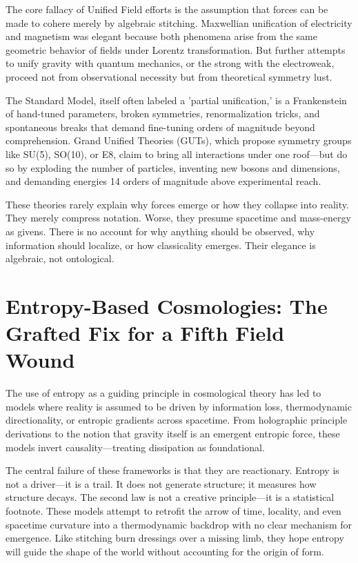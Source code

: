 The core fallacy of Unified Field efforts is the assumption that forces can be made to cohere merely by algebraic stitching. Maxwellian unification of electricity and magnetism was elegant because both phenomena arise from the same geometric behavior of fields under Lorentz transformation. But further attempts to unify gravity with quantum mechanics, or the strong with the electroweak, proceed not from observational necessity but from theoretical symmetry lust.

The Standard Model, itself often labeled a 'partial unification,' is a Frankenstein of hand-tuned parameters, broken symmetries, renormalization tricks, and spontaneous breaks that demand fine-tuning orders of magnitude beyond comprehension. Grand Unified Theories (GUTs), which propose symmetry groups like SU(5), SO(10), or E8, claim to bring all interactions under one roof—but do so by exploding the number of particles, inventing new bosons and dimensions, and demanding energies 14 orders of magnitude above experimental reach.

These theories rarely explain why forces emerge or how they collapse into reality. They merely compress notation. Worse, they presume spacetime and mass-energy as givens. There is no account for why anything should be observed, why information should localize, or how classicality emerges. Their elegance is algebraic, not ontological.


\section{Entropy-Based Cosmologies: The Grafted Fix for a Fifth Field Wound}
The use of entropy as a guiding principle in cosmological theory has led to models where reality is assumed to be driven by information loss, thermodynamic directionality, or entropic gradients across spacetime. From holographic principle derivations to the notion that gravity itself is an emergent entropic force, these models invert causality—treating dissipation as foundational.

The central failure of these frameworks is that they are reactionary. Entropy is not a driver—it is a trail. It does not generate structure; it measures how structure decays. The second law is not a creative principle—it is a statistical footnote. These models attempt to retrofit the arrow of time, locality, and even spacetime curvature into a thermodynamic backdrop with no clear mechanism for emergence. Like stitching burn dressings over a missing limb, they hope entropy will guide the shape of the world without accounting for the origin of form.

